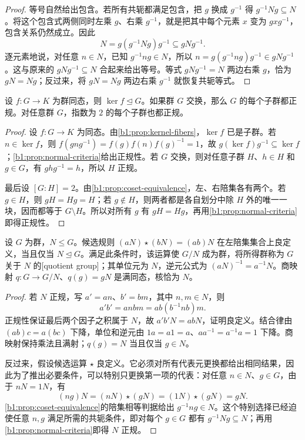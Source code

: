 \begin{proof}
	等号自然给出包含。若所有共轭都满足包含，把 \(g\) 换成 \(g^{-1}\) 得 \(g^{-1}Ng\subseteq N\)。将这个包含式两侧同时左乘 \(g\)、右乘 \(g^{-1}\)，就是把其中每个元素 \(x\) 变为 \(gxg^{-1}\)，包含关系仍然成立。因此
	\[
		N=g(g^{-1}Ng)g^{-1}\subseteq gNg^{-1}.
	\]
	逐元素地说，对任意 \(n\in N\)，已知 \(g^{-1}ng\in N\)，所以 \(n=g(g^{-1}ng)g^{-1}\in gNg^{-1}\)。这与原来的 \(gNg^{-1}\subseteq N\) 合起来给出等号。等式 \(gNg^{-1}=N\) 两边右乘 \(g\)，恰为 \(gN=Ng\)；反过来，将 \(gN=Ng\) 两边右乘 \(g^{-1}\) 就恢复共轭等式。
\end{proof}

\begin{proposition}[正规子群的基本例子]\label{b1:prop:normal-basic-examples}
	设 \(f:G\rightarrow K\) 为群同态，则 \(\ker f\trianglelefteq G\)。如果群 \(G\) 交换，那么 \(G\) 的每个子群都正规。对任意群 \(G\)，指数为 \(2\) 的每个子群也都正规。
\end{proposition}

\begin{proof}
	设 \(f:G\rightarrow K\) 为同态。由\cref{b1:prop:kernel-fibers}，\(\ker f\) 已是子群。若 \(n\in\ker f\)，则 \(f(gng^{-1})=f(g)f(n)f(g)^{-1}=1\)，故 \(g(\ker f)g^{-1}\subseteq\ker f\)；\cref{b1:prop:normal-criteria}给出正规性。若 \(G\) 交换，则对任意子群 \(H\)、\(h\in H\) 和 \(g\in G\)，有 \(ghg^{-1}=h\)，所以 \(H\) 正规。

	最后设 \([G:H]=2\)。由\cref{b1:prop:coset-equivalence}，左、右陪集各有两个。若 \(g\in H\)，则 \(gH=Hg=H\)；若 \(g\notin H\)，则两者都是各自划分中除 \(H\) 外的唯一一块，因而都等于 \(G\setminus H\)。所以对所有 \(g\) 有 \(gH=Hg\)，再用\cref{b1:prop:normal-criteria}即得正规性。
\end{proof}

\begin{theorem}[商群构造]\label{b1:thm:quotient-group}
	设 \(G\) 为群，\(N\leq G\)。候选规则 \((aN)\star(bN)=(ab)N\) 在左陪集集合上良定义，当且仅当 \(N\trianglelefteq G\)。满足此条件时，该运算使 \(G/N\) 成为群，将所得群称为 \(G\) 关于 \(N\) 的[quotient group]；其单位元为 \(N\)，逆元公式为 \((aN)^{-1}=a^{-1}N\)。商映射 \(q:G\rightarrow G/N\)、\(q(g)=gN\) 是满同态，核恰为 \(N\)。
\end{theorem}

\begin{proof}
	若 \(N\) 正规，写 \(a'=an\)、\(b'=bm\)，其中 \(n,m\in N\)，则
	\[
		a'b'=anbm=ab(b^{-1}nb)m.
	\]
	正规性保证最后两个因子之积属于 \(N\)，故 \(a'b'N=abN\)，证明良定义。结合律由 \((ab)c=a(bc)\) 下降，单位和逆元由 \(1a=a1=a\)、\(aa^{-1}=a^{-1}a=1\) 下降。商映射保持乘法且满射；\(q(g)=N\) 当且仅当 \(g\in N\)。

	反过来，假设候选运算 \(\star\) 良定义。它必须对所有代表元更换都给出相同结果，因此为了推出必要条件，可以特别只更换第一项的代表：对任意 \(n\in N\)、\(g\in G\)，由于 \(nN=1N\)，有
	\[
		(ng)N=(nN)\star(gN)=(1N)\star(gN)=gN.
	\]
	\cref{b1:prop:coset-equivalence}的陪集相等判据给出 \(g^{-1}ng\in N\)。这个特别选择已经迫使任意 \(n,g\) 满足所需的共轭条件，即对每个 \(g\in G\) 都有 \(g^{-1}Ng\subseteq N\)；再用\cref{b1:prop:normal-criteria}即得 \(N\) 正规。
\end{proof}


